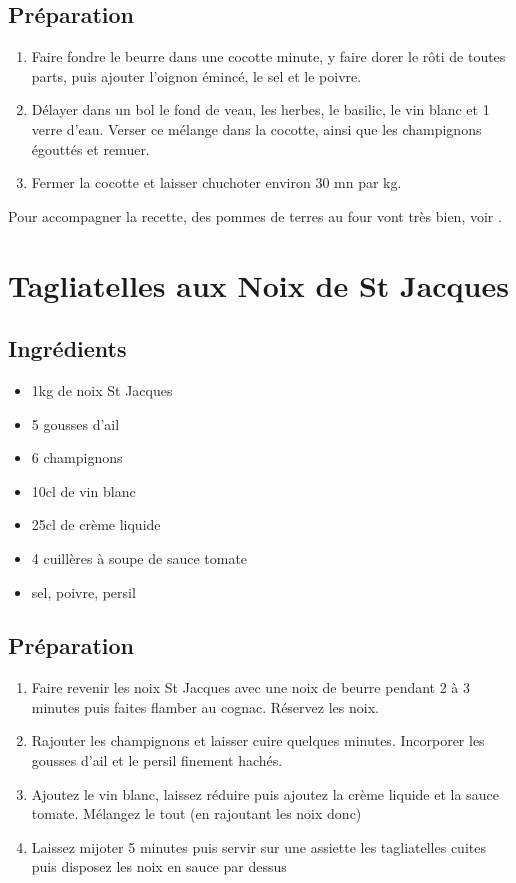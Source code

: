 \subsection*{Préparation}

\begin{enumerate}
\item Faire fondre le beurre dans une cocotte minute, y faire dorer le rôti de toutes parts, puis ajouter l'oignon émincé, le sel et le poivre.
\item Délayer dans un bol le fond de veau, les herbes, le basilic, le vin blanc et 1 verre d'eau. Verser ce mélange dans la cocotte, ainsi que les champignons égouttés et remuer.
\item Fermer la cocotte et laisser chuchoter environ 30 mn par kg.
\end{enumerate}

\begin{remarque}
Pour accompagner la recette, des pommes de terres au four vont très bien, voir .
\end{remarque}

\newpage
\section{Tagliatelles aux Noix de St Jacques}
\subsection*{Ingrédients}
\begin{itemize}
\item 1kg de noix St Jacques
\item 5 gousses d'ail
\item 6 champignons
\item 10cl de vin blanc
\item 25cl de crème liquide
\item 4 cuillères à soupe de sauce tomate
\item sel, poivre, persil
\end{itemize}

\subsection*{Préparation}
\begin{enumerate}
\item Faire revenir les noix St Jacques avec une noix de beurre pendant 2 à 3 minutes puis faites flamber au cognac. Réservez les noix.
\item Rajouter les champignons et laisser cuire quelques minutes. Incorporer les gousses d'ail et le persil finement hachés.
\item Ajoutez le vin blanc, laissez réduire puis ajoutez la crème liquide et la sauce tomate. Mélangez le tout (en rajoutant les noix donc)
\item Laissez mijoter 5 minutes puis servir sur une assiette les tagliatelles cuites puis disposez les noix en sauce par dessus
\end{enumerate}

